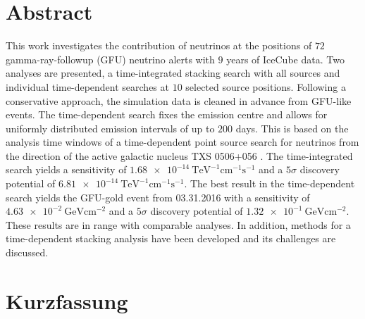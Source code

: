 \section*{Abstract}

This work investigates the contribution of neutrinos at the positions of $\num{72}$ gamma-ray-followup (GFU) neutrino alerts with $\num{9}$ years of IceCube data.
Two analyses are presented, a time-integrated stacking search with all sources and individual time-dependent searches at $\num{10}$ selected source positions.
Following a conservative approach, the simulation data is cleaned in advance from GFU-like events.
The time-dependent search fixes the emission centre and allows for uniformly distributed emission intervals of up to $\num{200}$ days.
This is based on the analysis time windows of a time-dependent point source search for neutrinos from the direction of the active galactic nucleus TXS 0506+056 \cite{_txs}.
The time-integrated search yields a sensitivity of $\SI{1.68e-14}{\tera\electronvolt\tothe{-1}\centi\meter\tothe{-1}\second\tothe{-1}}$ and a $\num{5}\sigma$ discovery potential of $\SI{6.81e-14}{\tera\electronvolt\tothe{-1}\centi\meter\tothe{-1}\second\tothe{-1}}$.
The best result in the time-dependent search yields the GFU-gold event from 03.31.2016 with a sensitivity of $\SI{4.63e-2}{\giga\electronvolt\centi\meter\tothe{-2}}$ and a $\num{5}\sigma$ discovery potential of $\SI{1.32e-1}{\giga\electronvolt\centi\meter\tothe{-2}}$.
These results are in range with comparable analyses.
In addition, methods for a time-dependent stacking analysis have been developed and its challenges are discussed.

\section*{Kurzfassung}


